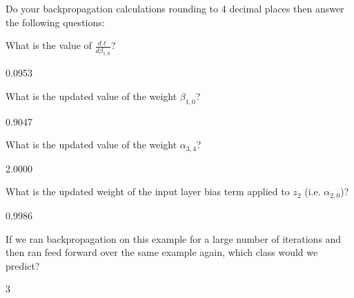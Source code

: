 \documentclass[11pt]{exam}
\numberwithin{equation}{section} %
\numberwithin{figure}{section} %
\numberwithin{table}{section} %
\begin{document}
\begin{enumerate}
	    Do your backpropagation calculations rounding to 4 decimal places then answer the following questions: 
	    
	     \begin{questions}
	        \question[1] What is the value of $\frac{d\ell}{d\beta_{1,0}}$?
	        
	        \begin{tcolorbox}[fit,height=1cm, width=2cm, blank, borderline={1pt}{-2pt}]
			0.0953
	        \end{tcolorbox}
	        
	     
	     
	        \question[1] What is the updated value of the weight $\beta_{1,0}$?
	        
	        \begin{tcolorbox}[fit,height=1cm, width=2cm, blank, borderline={1pt}{-2pt}]
			0.9047
	        \end{tcolorbox}
	        
	        
	        \question[2] What is the updated value of the weight ${\alpha}_{3,4}$?
	        
	        \begin{tcolorbox}[fit,height=1cm, width=2cm, blank, borderline={1pt}{-2pt}]
			2.0000
	        \end{tcolorbox}
	        
	        
	        \question[2] What is the updated weight of the input layer bias term applied to $z_2$ (i.e. ${\alpha}_{2,0}$)?
	        
	        \begin{tcolorbox}[fit,height=1cm, width=2cm, blank, borderline={1pt}{-2pt}]
			0.9986
	        \end{tcolorbox}
	        
	        
	        \question[1] If we ran backpropagation on this example for a large number of iterations and then ran feed forward over the same example again, which class would we predict?
	        
	        \begin{tcolorbox}[fit,height=1cm, width=2cm, blank, borderline={1pt}{-2pt}]
			3
	        \end{tcolorbox}
	        
	
	    \end{questions}
	
	
	    
	
	 

\end{enumerate}
\clearpage
\end{document}
